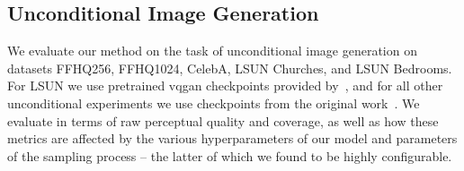 
\subsection{Unconditional Image Generation}

We evaluate our method on the task of unconditional image generation on datasets
FFHQ256, FFHQ1024, CelebA, LSUN Churches, and LSUN Bedrooms. For LSUN we use
pretrained \gls{vqgan} checkpoints provided by~\cite{bondtaylor2021unleashing},
and for all other unconditional experiments we use checkpoints from the original
work~\cite{esser2021taming}. We evaluate in terms of raw perceptual quality and
coverage, as well as how these metrics are affected by the various
hyperparameters of our model and parameters of the sampling process -- the
latter of which we found to be highly configurable.

